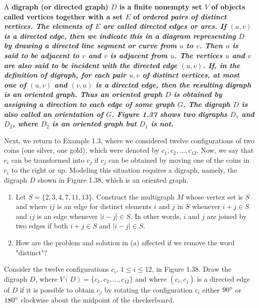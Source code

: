 A \bf{digraph} (or \bf{directed graph}) $D$ is a finite nonempty set $V$ of objects called \bf{vertices} together with a set $E$ of \it{ordered pairs} of distinct vertices. The elements of $E$ are called \bf{directed edges} or \bf{arcs}. If $(u,v)$ is a directed edge, then we indicate this in a diagram representing $D$ by drawing a directed line segment or curve from $u$ to $v$. Then $u$ is said to be \bf{adjacent to} $v$ and $v$ is \bf{adjacent from} $u$. The vertices $u$ and $v$ are also said to be \bf{incident with} the directed edge $(u,v)$. If, in the definition of \it{digraph}, for each pair $u,v$ of distinct vertices, at most one of $(u,v)$ and $(v,u)$ is a directed edge, then the resulting digraph is an \bf{oriented graph}. Thus an oriented graph $D$ is obtained by assigning a direction to each edge of some \it{graph} $G$. The digraph $D$ is also called an \bf{orientation} of $G$. Figure 1.37 shows two digraphs $D_{1}$ and $D_{2}$, where $D_{2}$ is an oriented graph but $D_{1}$ is not.



Next, we return to Example 1.3, where we considered twelve configurations of two coins (one silver, one gold), which were denoted by $c_{1},c_{2},\ldots,c_{12}$. Now, we say that $c_{i}$ can be transformed into $c_{j}$ if $c_{j}$ can be obtained by moving one of the coins in $c_{i}$ to the right or up. Modeling this situation requires a digraph, namely, the digraph $D$ shown in Figure 1.38, which is an oriented graph.



\begin{exers}\end{exers}

\begin{exer}
\begin{enumerate}[{(a)}]
\item Let $S = \{2,3,4,7,11,13\}$. Construct the multigraph $M$ whose vertex set is $S$ and where $ij$ is an edge for distinct elements $i$ and $j$ in $S$ whenever $i+j \in S$ and $ij$ is an edge whenever $|i-j| \in S$. In other words, $i$ and $j$ are joined by two edges if both $i+j \in S$ and $|i-j| \in S$.
\item How are the problem and solution in (a) affected if we remove the word "distinct"?
\end{enumerate}
\end{exer}

\begin{exer}
Consider the twelve configurations $c_{i}$, $1 \leq i \leq 12$, in Figure 1.38. Draw the digraph $D$, where $V(D) = \{c_{1},c_{2},\ldots,c_{12}\}$ and where $(c_{i},c_{j})$ is a directed edge of $D$ if it is possible to obtain $c_{j}$ by rotating the configuration $c_{i}$ either $90^{\circ}$ or $180^{\circ}$ clockwise about the midpoint of the checkerboard.
\end{exer}


